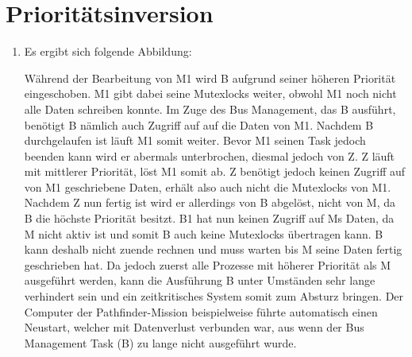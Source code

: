 \documentclass[a4paper,11pt,ngerman]{scrartcl}
\begin{document}
\section{Prioritätsinversion}

\begin{enumerate}[\bf a)]
    \item Es ergibt sich folgende Abbildung:
    \begin{center}
        \scalebox{0.4}{}
    \end{center}
    
    
    Während der Bearbeitung von M1 wird B aufgrund seiner höheren Priorität eingeschoben. M1 gibt dabei seine Mutexlocks weiter, obwohl M1 noch nicht alle Daten schreiben konnte. Im Zuge des Bus Management, das B ausführt, benötigt B nämlich auch Zugriff auf auf die Daten von M1. Nachdem B durchgelaufen ist läuft M1 somit weiter. Bevor M1 seinen Task jedoch beenden kann wird er abermals unterbrochen, diesmal jedoch von Z. Z läuft mit mittlerer Priorität, löst M1 somit ab. Z benötigt jedoch keinen Zugriff auf von M1 geschriebene Daten, erhält also auch nicht die Mutexlocks von M1. Nachdem Z nun fertig ist wird er allerdings von B abgelöst, nicht von M, da B die höchste Priorität besitzt. B1 hat nun keinen Zugriff auf Ms Daten, da M nicht aktiv ist und somit B auch keine Mutexlocks übertragen kann. B kann deshalb nicht zuende rechnen und muss warten bis M seine Daten fertig geschrieben hat. Da jedoch zuerst alle Prozesse mit höherer Priorität als M ausgeführt werden, kann die Ausführung B unter Umständen sehr lange verhindert sein und ein zeitkritisches System somit zum Absturz bringen. Der Computer der Pathfinder-Mission beispielweise führte automatisch einen Neustart, welcher mit Datenverlust verbunden war, aus wenn der Bus Management Task (B) zu lange nicht ausgeführt wurde. 
\end{enumerate}
\end{document}
